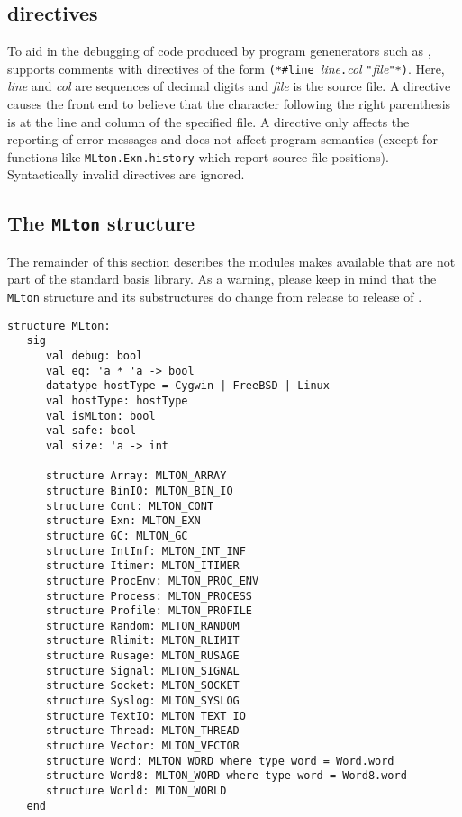 
\subsection{{\nline} directives}
To aid in the debugging of code produced by program genenerators such as
,
{\mlton} supports comments with {\nline} directives of the form {\tt (*\#line
}{\it line}{\tt.}{\it col} {\tt "}{\it file}{\tt"*)}.  Here, {\it line} and {\it
col} are sequences of decimal digits and {\it file} is the source file.  A
{\nline} directive causes the front end to believe that the character following
the right parenthesis is at the line and column of the specified file.  A
{\nline} directive only affects the reporting of error messages and does not
affect program semantics (except for functions like {\tt MLton.Exn.history}
which report source file positions).  Syntactically invalid {\nline} directives
are ignored.

\subsection{The {\tt MLton} structure}

The remainder of this section describes the modules {\mlton} makes available
that are not part of the standard basis library.  As a warning, please keep in
mind that the {\tt MLton} structure and its substructures do change from release
to release of {\mlton}.  

\begin{verbatim}
structure MLton:
   sig
      val debug: bool
      val eq: 'a * 'a -> bool
      datatype hostType = Cygwin | FreeBSD | Linux
      val hostType: hostType
      val isMLton: bool
      val safe: bool
      val size: 'a -> int

      structure Array: MLTON_ARRAY
      structure BinIO: MLTON_BIN_IO
      structure Cont: MLTON_CONT
      structure Exn: MLTON_EXN
      structure GC: MLTON_GC
      structure IntInf: MLTON_INT_INF
      structure Itimer: MLTON_ITIMER
      structure ProcEnv: MLTON_PROC_ENV
      structure Process: MLTON_PROCESS
      structure Profile: MLTON_PROFILE
      structure Random: MLTON_RANDOM
      structure Rlimit: MLTON_RLIMIT
      structure Rusage: MLTON_RUSAGE
      structure Signal: MLTON_SIGNAL
      structure Socket: MLTON_SOCKET
      structure Syslog: MLTON_SYSLOG
      structure TextIO: MLTON_TEXT_IO
      structure Thread: MLTON_THREAD
      structure Vector: MLTON_VECTOR
      structure Word: MLTON_WORD where type word = Word.word
      structure Word8: MLTON_WORD where type word = Word8.word
      structure World: MLTON_WORLD
   end
\end{verbatim}

